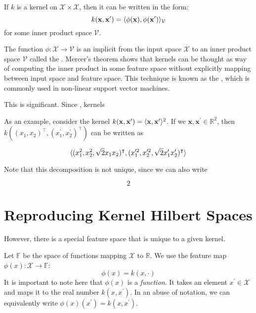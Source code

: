 \begin{theorem}
If $k$ is a kernel on $\mathcal{X} \times \mathcal{X}$, then it can be written in the form:
\begin{equation}
  k(\mathbf{x}, \mathbf{x}^\prime) = \langle\phi(\mathbf{x}), \phi(\mathbf{x}^\prime)\rangle_\mathcal{V}
\end{equation}
for some inner product space $\mathcal{V}$.
\end{theorem}

The function $\phi : \mathcal{X} \to \mathcal{V}$ is an implicit  from the input space $\mathcal{X}$ to an inner product space $\mathcal{V}$ called the . Mercer's theorem shows that kernels can be thought as way of computing the inner product in some feature space without explicitly mapping between input space and feature space. This technique is known as the , which is commonly used in non-linear support vector machines.

This is significant. Since , kernels 

As an example, consider the kernel $k(\mathbf{x}, \mathbf{x}^\prime) = \langle\mathbf{x}, \mathbf{x}^\prime\rangle^2$. If we $\mathbf{x}, \mathbf{x}^\prime \in \mathbb{R}^2$, then $k((x_1, x_2)^\intercal, (x_1^\prime, x_2^\prime)^\intercal)$ can be written as

\begin{equation}
\langle(x_1^2, x_2^2, \sqrt{2} x_1 x_2)^\intercal, (x_1^{\prime 2}, x_2^{\prime 2}, \sqrt{2} x_1^\prime x_2^\prime)^\intercal\rangle
\end{equation}

Note that this decomposition is not unique, since we can also write

\begin{equation}
2
\end{equation}

\section{Reproducing Kernel Hilbert Spaces}
However, there is a special feature space that is unique to a given kernel. 

Let $\mathbb{F}$ be the space of functions mapping $\mathcal{X}$ to $\mathbb{R}$. We use the feature map $\phi(x) : \mathcal{X} \to \mathbb{F}$:
\begin{equation}
	\phi(x) = k(x, \cdot)
\end{equation}
It is important to note here that $\phi(x)$ is a \emph{function}. It takes an element $x^\prime \in \mathcal{X}$ and maps it to the real number $k(x, x^\prime)$. In an abuse of notation, we can equivalently write $\phi(x)(x^\prime) = k(x, x^\prime)$.

